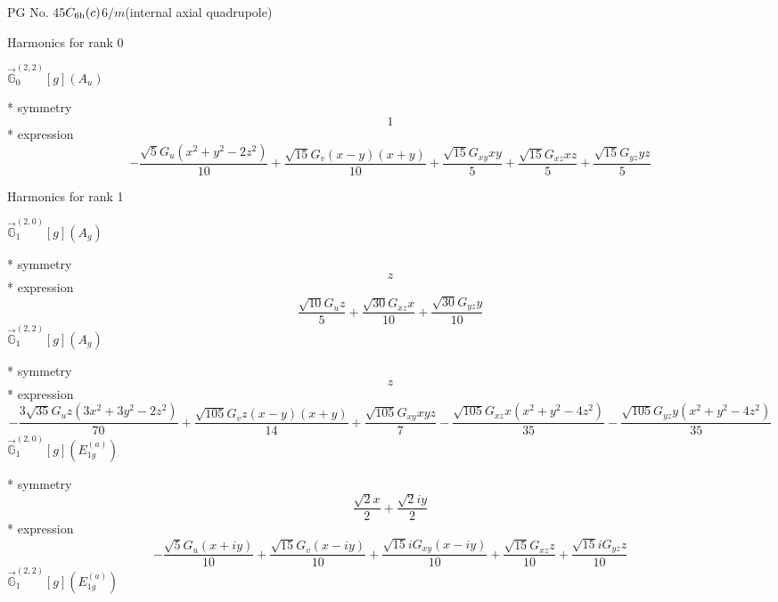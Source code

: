 \documentclass[fleqn,8pt]{jsarticle}
\begin{document}
\setcounter{MaxMatrixCols}{32}

\renewcommand{\tablename}{Table~}
\renewcommand{\figurename}{Figure~}
\begin{center}
\LARGE
PG No. 45\quad$C_{\rm 6h}(c)$\quad$6/m$\quad[ hexagonal ] (internal axial quadrupole)
\end{center}

\noindent * Harmonics for rank 0

\noindent\quad $\vec{\mathbb{G}}_{0}^{(2,2)}[g](A_{u})$

\noindent\quad ** symmetry
\begin{dmath*}
1
\end{dmath*}
\noindent\quad ** expression
\begin{dmath*}
- \frac{\sqrt{5} G_{u} \left(x^{2} + y^{2} - 2 z^{2}\right)}{10} + \frac{\sqrt{15} G_{v} \left(x - y\right) \left(x + y\right)}{10} + \frac{\sqrt{15} G_{xy} x y}{5} + \frac{\sqrt{15} G_{xz} x z}{5} + \frac{\sqrt{15} G_{yz} y z}{5}
\end{dmath*}

\noindent * Harmonics for rank 1

\noindent\quad $\vec{\mathbb{G}}_{1}^{(2,0)}[g](A_{g})$

\noindent\quad ** symmetry
\begin{dmath*}
z
\end{dmath*}
\noindent\quad ** expression
\begin{dmath*}
\frac{\sqrt{10} G_{u} z}{5} + \frac{\sqrt{30} G_{xz} x}{10} + \frac{\sqrt{30} G_{yz} y}{10}
\end{dmath*}
\noindent\quad $\vec{\mathbb{G}}_{1}^{(2,2)}[g](A_{g})$

\noindent\quad ** symmetry
\begin{dmath*}
z
\end{dmath*}
\noindent\quad ** expression
\begin{dmath*}
- \frac{3 \sqrt{35} G_{u} z \left(3 x^{2} + 3 y^{2} - 2 z^{2}\right)}{70} + \frac{\sqrt{105} G_{v} z \left(x - y\right) \left(x + y\right)}{14} + \frac{\sqrt{105} G_{xy} x y z}{7} - \frac{\sqrt{105} G_{xz} x \left(x^{2} + y^{2} - 4 z^{2}\right)}{35} - \frac{\sqrt{105} G_{yz} y \left(x^{2} + y^{2} - 4 z^{2}\right)}{35}
\end{dmath*}
\noindent\quad $\vec{\mathbb{G}}_{1}^{(2,0)}[g](E_{1g}^{(a)})$

\noindent\quad ** symmetry
\begin{dmath*}
\frac{\sqrt{2} x}{2} + \frac{\sqrt{2} i y}{2}
\end{dmath*}
\noindent\quad ** expression
\begin{dmath*}
- \frac{\sqrt{5} G_{u} \left(x + i y\right)}{10} + \frac{\sqrt{15} G_{v} \left(x - i y\right)}{10} + \frac{\sqrt{15} i G_{xy} \left(x - i y\right)}{10} + \frac{\sqrt{15} G_{xz} z}{10} + \frac{\sqrt{15} i G_{yz} z}{10}
\end{dmath*}
\noindent\quad $\vec{\mathbb{G}}_{1}^{(2,2)}[g](E_{1g}^{(a)})$
\end{document}
